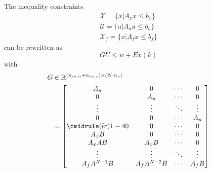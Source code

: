 The inequality constraints
\begin{gather*}
    \mathcal{X} = \{x|A_x x \leq b_x\} \\
    \mathcal{U} = \{u|A_u u \leq b_u\} \\
    \mathcal{X}_f = \{x|A_f x \leq b_f\}
\end{gather*}
can be rewritten as
\begin{equation*}
    GU\leq w + Ex(k)
\end{equation*}
with
\begin{align*}
    G & \in \mathbb{R}^{(n_{in,u} + n_{in,x})\times (N\cdot n_u)} \\
      & = \begin{bmatrix}
              A_u                   & 0             & \cdots & 0      \\
              0                     & A_u           & \cdots & 0      \\
              \vdots                & \vdots        & \ddots & \vdots \\
              0                     & 0             & \cdots & A_u    \\
              \cmidrule(lr){1-4}  0 & 0             & \cdots & 0      \\
              A_x B                 & 0             & \cdots & 0      \\
              A_x AB                & A_x B         & \cdots & 0      \\
              \vdots                & \vdots        & \ddots & \vdots \\
              A_f A^{N-1} B         & A_f A^{N-2} B & \cdots & A_f B
          \end{bmatrix}
\end{align*}
